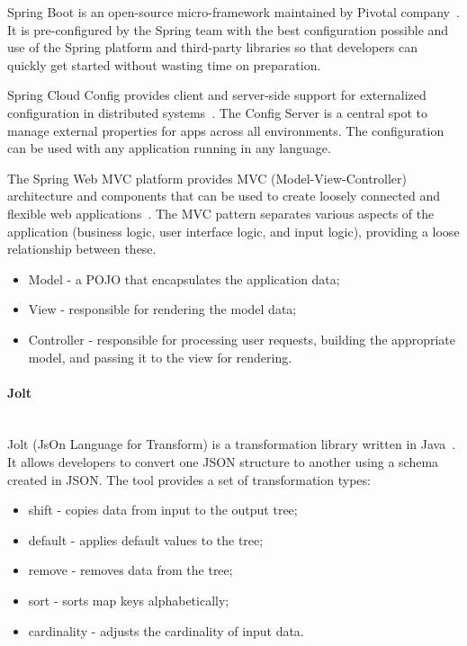 Spring Boot is an open-source micro-framework maintained by Pivotal company~\cite{spring-boot}. It is pre-configured by the Spring team with the best configuration possible and use of the Spring platform and third-party libraries so that developers can quickly get started without wasting time on preparation.

Spring Cloud Config provides client and server-side support for externalized configuration in distributed systems~\cite{spring-cloud-config}. The Config Server is a central spot to manage external properties for apps across all environments. The configuration can be used with any application running in any language.

The Spring Web MVC platform provides MVC (Model-View-Controller) architecture and components that can be used to create loosely connected and flexible web applications~\cite{spring-mvc}. The MVC pattern separates various aspects of the application (business logic, user interface logic, and input logic), providing a loose relationship between these.

\begin{itemize}
    \item Model - a POJO that encapsulates the application data;
    \item View - responsible for rendering the model data;
    \item Controller - responsible for processing user requests, building the appropriate model, and passing it to the view for rendering.
\end{itemize}

\paragraph{\large{Jolt}}\mbox{}\\[2pt]
Jolt (JsOn Language for Transform) is a transformation library written in Java~\cite{jolt}. It allows developers to convert one JSON structure to another using a schema created in JSON. The tool provides a set of transformation types:

\begin{itemize}
    \item shift - copies data from input to the output tree;
    \item default - applies default values to the tree;
    \item remove - removes data from the tree;
    \item sort - sorts map keys alphabetically;
    \item cardinality - adjusts the cardinality of input data.
\end{itemize}

